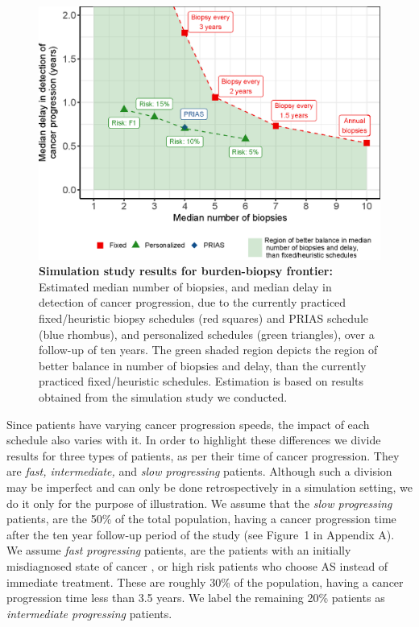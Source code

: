 \begin{figure}[!htb]
\captionsetup{justification=justified}
\centerline{\includegraphics[width=\columnwidth]{images/better_balance_results.eps}}
\caption{\textbf{Simulation study results for burden-biopsy frontier:} Estimated median number of biopsies, and median delay in detection of cancer progression, due to the currently practiced fixed/heuristic biopsy schedules (red squares) and PRIAS schedule (blue rhombus), and personalized schedules (green triangles), over a follow-up of ten years. The green shaded region depicts the region of better balance in number of biopsies and delay, than the currently practiced fixed/heuristic schedules. Estimation is based on results obtained from the simulation study we conducted. }
\label{fig:better_balance_results}
\end{figure}

Since patients have varying cancer progression speeds, the impact of each schedule also varies with it. In order to highlight these differences we divide results for three types of patients, as per their time of cancer progression. They are \textit{fast, intermediate,} and \textit{slow progressing} patients. Although such a division may be imperfect and can only be done retrospectively in a simulation setting, we do it only for the purpose of illustration. We assume that the \textit{slow progressing} patients, are the 50\% of the total population, having a cancer progression time after the ten year follow-up period of the study (see Figure~1 in Appendix A). We assume \textit{fast progressing} patients, are the patients with an initially misdiagnosed state of cancer \cite{cooperberg2011outcomes}, or high risk patients who choose AS instead of immediate treatment. These are roughly 30\% of the population, having a cancer progression time less than 3.5 years. We label the remaining 20\% patients as \textit{intermediate progressing} patients. 

